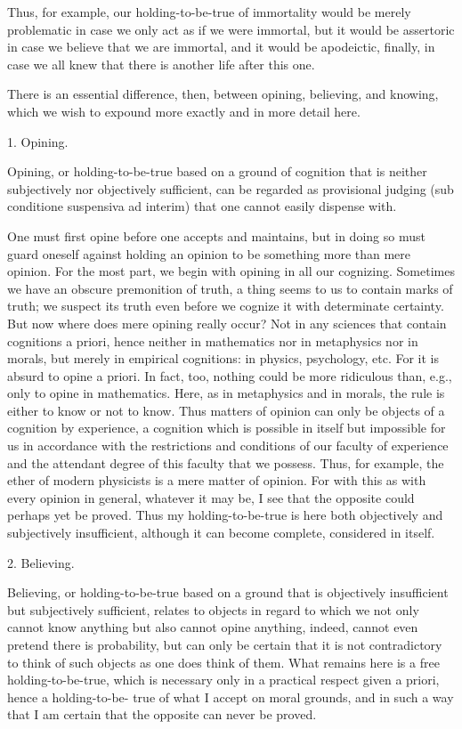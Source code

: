     Thus, for example, our holding-to-be-true of immortality would be
    merely problematic in case we only act as if we were immortal,
    but it would be assertoric in case we believe that we are immortal,
    and it would be apodeictic, finally, in case we all knew that
    there is another life after this one.

    There is an essential difference, then, between opining, believing, and knowing,
    which we wish to expound more exactly and in more detail here.

    1. Opining.

    Opining, or holding-to-be-true based on a ground of cognition
    that is neither subjectively nor objectively sufficient, can be regarded
    as provisional judging (sub conditione suspensiva ad interim) that
    one cannot easily dispense with.

    One must first opine before one accepts and maintains,
    but in doing so must guard oneself against holding an opinion to be
    something more than mere opinion.
    For the most part, we begin with
    opining in all our cognizing. Sometimes we have an obscure premonition
    of truth, a thing seems to us to contain marks of truth; we suspect its truth
    even before we cognize it with determinate certainty.
    But now where does mere opining really occur?
    Not in any sciences that contain cognitions a priori,
    hence neither in mathematics nor in metaphysics nor in morals,
    but merely in empirical cognitions: in physics, psychology, etc.
    For it is absurd to opine a priori.
    In fact, too, nothing could be more ridiculous than, e.g.,
    only to opine in mathematics.
    Here, as in metaphysics and in morals,
    the rule is either to know or not to know.
    Thus matters of opinion can only be objects of a cognition by experience,
    a cognition which is possible in itself but impossible for us in accordance
    with the restrictions and conditions of our faculty of experience and the
    attendant degree of this faculty that we possess.
    Thus, for example, the ether of modern physicists is a mere matter of opinion.
    For with this as with every opinion in general, whatever it may be,
    I see that the opposite could perhaps yet be proved.
    Thus my holding-to-be-true is here both objectively and subjectively insufficient,
    although it can become complete, considered in itself.

    2. Believing.

    Believing, or holding-to-be-true based on a ground that is
    objectively insufficient but subjectively sufficient, relates to objects in
    regard to which we not only cannot know anything but also cannot opine
    anything, indeed, cannot even pretend there is probability, but can only be
    certain that it is not contradictory to think of such objects as one does
    think of them. What remains here is a free holding-to-be-true, which is
    necessary only in a practical respect given a priori, hence a holding-to-be-
    true of what I accept on moral grounds, and in such a way that I am certain
    that the opposite can never be proved.

